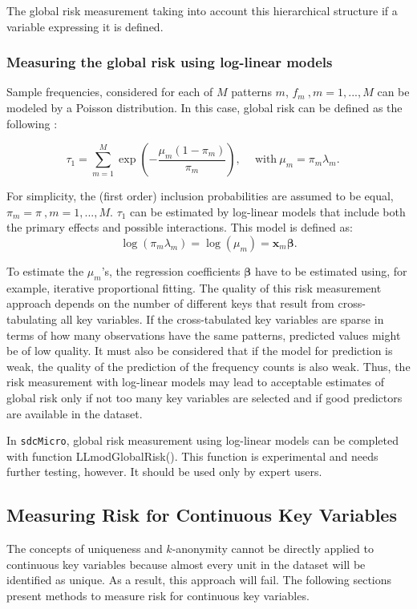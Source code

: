 \documentclass[12pt]{scrartcl}\usepackage[]{graphicx}\usepackage[]{color}
\newcommand{\sdcMicro}{\texttt{sdcMicro}}
\begin{document}
The global risk measurement taking into account this hierarchical structure if a variable expressing it is defined.

\subsubsection{Measuring the global risk using log-linear models} \label{sec:GR}
Sample frequencies, considered for each of $M$ patterns $m$, $f_m \ , m=1,...,M$ can be modeled by a Poisson distribution. In this case, global risk can be defined as the following \citep[see also][]{Skinner98}:

\begin{equation}
\tau_1 = \sum\limits_{m=1}^{M} \exp\left( -\frac{\mu_m (1 - \pi_m)}{\pi_m}\right), \quad \ \mbox{with} \ \mu_m=\pi_m \lambda_m. \quad
\end{equation}

For simplicity, the (first order) inclusion probabilities are assumed to be equal, $\pi_m=\pi \ , m=1,...,M$. $\tau_1$ can be estimated by log-linear models that include both the primary effects and possible interactions. This model is defined as:
\begin{displaymath}
\log (\pi_m \lambda_m) = \log (\mu_m) = \mathbf{x}_m \mathbf{\beta}.
\end{displaymath}

To estimate the $\mu_m$'s, the regression coefficients $\mathbf{\beta}$ have to be estimated using, for example, iterative proportional fitting. The quality of this risk measurement approach depends on the number of different keys that result from cross-tabulating all key variables. If the cross-tabulated key variables are sparse in terms of how many observations have the same patterns, predicted values might be of low quality. It must also be considered that if the model for prediction is weak, the quality of the prediction of the frequency counts is also weak. Thus, the risk measurement with log-linear models may lead to acceptable estimates of global risk only if not too many key variables are selected and if good predictors are available in the dataset.

In \sdcMicro , global risk measurement using log-linear models can be completed with function LLmodGlobalRisk(). This function is experimental and needs further testing, however. It should be used only by expert users.

\subsection{Measuring Risk for Continuous Key Variables}
The concepts of uniqueness and $k$-anonymity cannot be directly applied to continuous key variables because almost every unit in the dataset will be identified as unique. As a result, this approach will fail. The following sections present methods to measure risk for continuous key variables.
\end{document}

